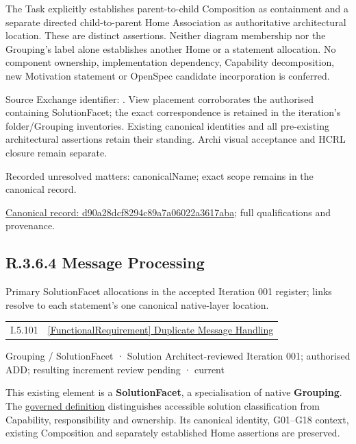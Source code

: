 The Task explicitly establishes parent-to-child Composition as containment and
a separate directed child-to-parent Home Association as authoritative architectural
location. These are distinct assertions. Neither diagram membership nor the
Grouping's label alone establishes another Home or a statement allocation.
No component ownership, implementation dependency, Capability decomposition,
new Motivation statement or OpenSpec candidate incorporation is conferred.



Source Exchange identifier: \texttt{}. View placement corroborates
the authorised containing SolutionFacet; the exact correspondence is retained in the
iteration's folder/Grouping inventories. Existing canonical identities and all
pre-existing architectural assertions retain their standing. Archi visual
acceptance and HCRL closure remain separate.


{\small Recorded unresolved matters: canonicalName; exact scope remains in the canonical record.}\par
{\footnotesize \href{../../../../../../../continuum/grouping/d90a28dcf8294c89a7a06022a3617aba.md}{Canonical record: d90a28dcf8294c89a7a06022a3617aba}; full qualifications and provenance.}\par
\subsection*{R.3.6.4 Message Processing}
\label{navigation:R.3.6.4}

Primary SolutionFacet allocations in the accepted Iteration 001 register; links resolve to each statement’s one canonical native-layer location.\par
\begin{longtable}{p{.22\linewidth}p{.73\linewidth}}
I.5.101 & \hyperref[element:76a67526fcdf40999f375a8cac54d5ef]{[FunctionalRequirement] Duplicate Message Handling} \\
\end{longtable}
\label{element:5dde6ebecd094084b325ba59603bb919}
{\small Grouping / SolutionFacet · Solution Architect-reviewed Iteration 001; authorised ADD; resulting increment review pending · current}\par

This existing element is a \textbf{SolutionFacet}, a specialisation of native
\textbf{Grouping}. The \href{\detokenize{../../../../../../../governance/continuum-representation.md#solutionfacet-classification--1119-candidate}}{governed definition}
distinguishes accessible solution classification from Capability, responsibility
and ownership. Its canonical identity, G01–G18 context, existing Composition
and separately established Home assertions are preserved.




